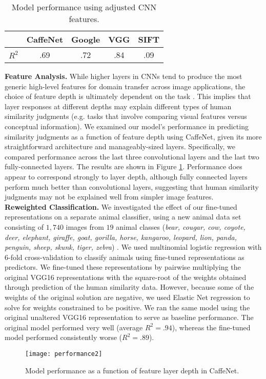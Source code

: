 \documentclass[10pt,letterpaper]{article}
\begin{document}
\begin{table}
\begin{center}
\caption{Model performance using adjusted CNN features.}
\label{adjust-results}
\vskip 0.12in
\begin{tabular}{lcccc}
      & CaffeNet & Google & VGG & SIFT \\
\hline
$R^{2}$ & .69  & .72 & .84 & .09  \\
\end{tabular}
\end{center}
\end{table}

\noindent\textbf{Feature Analysis.} While higher layers in CNNs tend to produce the most generic high-level features for domain transfer across image applications, the choice of feature depth is ultimately dependent on the task \citep*{sainath2013learning}. This implies that layer responses at different depths may explain different types of human similarity judgments (e.g. tasks that involve comparing visual features versus conceptual information). We examined our model's performance in predicting similarity judgments as a function of feature depth using CaffeNet, given its more straightforward architecture and manageably-sized layers. Specifically, we compared performance across the last three convolutional layers and the last two fully-connected layers. The results are shown in Figure \ref{model-performance}. Performance does appear to correspond strongly to layer depth, although fully connected layers perform much better than convolutional layers, suggesting that human similarity judgments may not be explained well from simpler image features.\\

\noindent\textbf{Reweighted Classification.} We investigated the effect of our fine-tuned representations on a separate animal classifier, using a new animal data set consisting of $1,740$ images from $19$ animal classes (\textit{bear, cougar, cow, coyote, deer, elephant, giraffe, goat, gorilla, horse, kangaroo, leopard, lion, panda, penguin, sheep, skunk, tiger, zebra}) \citep*{afkham2008joint}. We used multinomial logistic regression with 6-fold cross-validation to classify animals using fine-tuned representations as predictors. We fine-tuned these representations by pairwise multiplying the original VGG16 representations with the square-root of the weights obtained through prediction of the human similarity data. However, because some of the weights of the original solution are negative, we used Elastic Net regression to solve for weights constrained to be positive. We ran the same model using the original unaltered VGG16 representation to serve as baseline performance. The original model performed very well (average $R^2=.94$), whereas the fine-tuned model performed consistently worse ($R^2=.89$).
%
\begin{figure}%
\begin{center}
\texttt{[image: performance2]}
\end{center}
\vspace{-10px}
\caption{Model performance as a function of feature layer depth in CaffeNet.}
\label{model-performance}
\end{figure}
%
\end{document}
